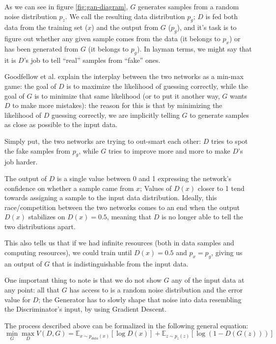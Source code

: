 As we can see in figure \ref{fig:gan-diagram}, $G$ generates samples from a random noise distribution $p_z$. We call the resulting data distribution $p_g$; $D$ is fed both data from the training set ($x$) and the output from $G$ ($p_g$), and it's task is to figure out whether any given sample comes from the data (it belongs to $p_x$) or has been generated from $G$ (it belongs to $p_g$). In layman terms, we might say that it is $D$'s job to tell \enquote{real} samples from \enquote{fake} ones.

Goodfellow et al.\cite{Goodfellow2014} explain the interplay between the two networks as a min-max game: the goal of $D$ is to maximize the likelihood of guessing correctly, while the goal of $G$ is to minimize that same likelihood (or to put it another way, $G$ wants $D$ to make more mistakes): the reason for this is that by minimizing the likelihood of $D$ guessing correctly, we are implicitly telling $G$ to generate samples as close as possible to the input data.

Simply put, the two networks are trying to out-smart each other: $D$ tries to spot the fake samples from $p_g$, while $G$ tries to improve more and more to make $D$'s job harder.

The output of $D$ is a single value between 0 and 1 expressing the network's confidence on whether a sample came from $x$; Values of $D(x)$ closer to 1 tend towards assigning a sample to the input data distribution.
Ideally, this race/competition between the two networks comes to an end when the output $D(x)$ stabilizes on $D(x)=0.5$, meaning that $D$ is no longer able to tell the two distributions apart.

This also tells us that if we had infinite resources (both in  data samples and computing resources), we could train until $D(x)=0.5$ and $p_x=p_g$, giving us an output of $G$ that is indistinguishable from the input data.

One important thing to note is that we do not show $G$ any of the input data at any point: all that $G$ has access to is a random noise distribution and the error value for $D$; the Generator has to slowly shape that noise into data resembling the Discriminator's input, by using Gradient Descent.  

The process described above can be formalized in the following general equation:
\begin{equation}
 \min\limits_{G} \max\limits_{D} V(D,G)=\mathbb{E}_{x\sim p_{data}(x)}[\log{D(x)}]+\mathbb{E}_{z\sim p_z(z)}[\log{(1-D(G(z)))}] 
\end{equation} 

